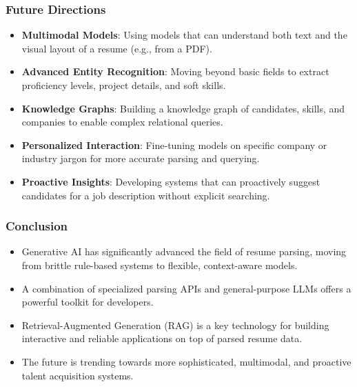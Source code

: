 \begin{frame}[fragile]\frametitle{Future Directions}
    \begin{itemize}
        \item \textbf{Multimodal Models}: Using models that can understand both text and the visual layout of a resume (e.g., from a PDF).
        \item \textbf{Advanced Entity Recognition}: Moving beyond basic fields to extract proficiency levels, project details, and soft skills.
        \item \textbf{Knowledge Graphs}: Building a knowledge graph of candidates, skills, and companies to enable complex relational queries.
        \item \textbf{Personalized Interaction}: Fine-tuning models on specific company or industry jargon for more accurate parsing and querying.
        \item \textbf{Proactive Insights}: Developing systems that can proactively suggest candidates for a job description without explicit searching.
    \end{itemize}
\end{frame}

\begin{frame}[fragile]\frametitle{Conclusion}
    \begin{itemize}
        \item Generative AI has significantly advanced the field of resume parsing, moving from brittle rule-based systems to flexible, context-aware models.
        \item A combination of specialized parsing APIs and general-purpose LLMs offers a powerful toolkit for developers.
        \item Retrieval-Augmented Generation (RAG) is a key technology for building interactive and reliable applications on top of parsed resume data.
        \item The future is trending towards more sophisticated, multimodal, and proactive talent acquisition systems.
    \end{itemize}
\end{frame}

